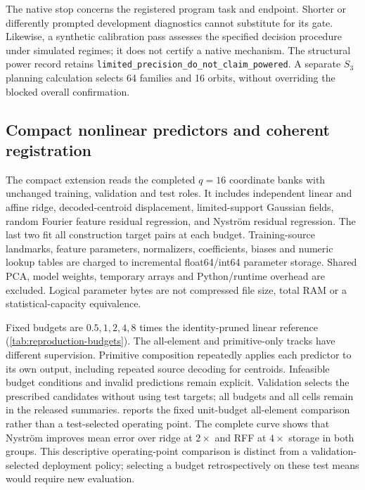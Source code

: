 The native stop concerns the registered program task and endpoint. Shorter or differently prompted development diagnostics cannot substitute for its gate. Likewise, a synthetic calibration pass assesses the specified decision procedure under simulated regimes; it does not certify a native mechanism. The structural power record retains \texttt{limited\_precision\_do\_not\_claim\_powered}. A separate $S_3$ planning calculation selects 64 families and 16 orbits, without overriding the blocked overall confirmation.

\subsection{Compact nonlinear predictors and coherent registration}
The compact extension reads the completed $q=16$ coordinate banks with unchanged training, validation and test roles. It includes independent linear and affine ridge, decoded-centroid displacement, limited-support Gaussian fields, random Fourier feature residual regression, and Nystr\"om residual regression. The last two fit all construction target pairs at each budget. Training-source landmarks, feature parameters, normalizers, coefficients, biases and numeric lookup tables are charged to incremental float64/int64 parameter storage. Shared PCA, model weights, temporary arrays and Python/runtime overhead are excluded. Logical parameter bytes are not compressed file size, total RAM or a statistical-capacity equivalence.



Fixed budgets are $0.5,1,2,4,8$ times the identity-pruned linear reference (\cref{tab:reproduction-budgets}). The all-element and primitive-only tracks have different supervision. Primitive composition repeatedly applies each predictor to its own output, including repeated source decoding for centroids. Infeasible budget conditions and invalid predictions remain explicit. Validation selects the prescribed candidates without using test targets; all budgets and all cells remain in the released summaries.  reports the fixed unit-budget all-element comparison rather than a test-selected operating point. The complete curve shows that Nystr\"om improves mean error over ridge at $2\times$ and RFF at $4\times$ storage in both groups. This descriptive operating-point comparison is distinct from a validation-selected deployment policy; selecting a budget retrospectively on these test means would require new evaluation.

